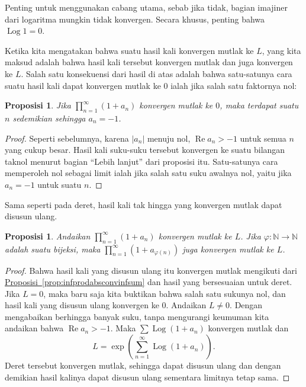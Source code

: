 \documentclass[12pt,openany]{book}
\renewcommand{\Re}{\operatorname{Re}}
\newcommand{\Log}{\operatorname{Log}}
\newcommand{\sabs}[1]{\lvert {#1} \rvert}
\newcommand{\N}{{\mathbb{N}}}
\newcommand{\myquote}[1]{``#1''}
\theoremstyle{plain}
\newtheorem{prop}[thm]{Proposisi}
\theoremstyle{remark}
\theoremstyle{definition}
\theoremstyle{exercise}
\theoremstyle{example}
\newcommand{\propref}[1]{\hyperref[#1]{Proposisi~\ref*{#1}}}
\begin{document}
Penting untuk menggunakan cabang utama, sebab jika tidak, bagian imajiner
dari logaritma mungkin tidak konvergen.  Secara khusus, penting
bahwa $\Log 1 = 0$.

Ketika kita mengatakan bahwa suatu hasil kali konvergen mutlak ke $L$, yang kita maksud adalah bahwa
hasil kali tersebut konvergen mutlak dan juga konvergen ke $L$.
Salah satu konsekuensi dari hasil di atas adalah bahwa satu-satunya cara
suatu hasil kali dapat konvergen mutlak ke $0$ ialah jika salah satu
faktornya nol:

\begin{prop}
Jika $\prod_{n=1}^\infty (1+a_n)$ konvergen mutlak ke $0$, maka terdapat
suatu $n$ sedemikian sehingga $a_n=-1$.
\end{prop}

\begin{proof}
Seperti sebelumnya, karena $\sabs{a_n}$ menuju nol,
$\Re a_n > -1$ untuk semua $n$ yang cukup besar.  Hasil kali
suku-suku tersebut konvergen ke suatu bilangan taknol menurut bagian \myquote{Lebih lanjut} dari
proposisi itu.  Satu-satunya cara memperoleh nol sebagai limit ialah jika salah satu suku
awalnya nol, yaitu jika $a_n=-1$ untuk suatu $n$.
\end{proof}

Sama seperti pada deret,
hasil kali tak hingga yang konvergen mutlak dapat disusun ulang.

\begin{prop}
Andaikan $\prod_{n=1}^\infty (1+a_n)$ konvergen mutlak ke $L$.
Jika $\varphi \colon \N \to \N$ adalah suatu bijeksi, maka 
$\prod_{n=1}^\infty (1+a_{\varphi(n)})$ juga konvergen mutlak ke $L$.
\end{prop}

\begin{proof}
Bahwa hasil kali yang disusun ulang itu konvergen mutlak mengikuti dari 
\propref{prop:infprodabsconvinfsum} dan hasil yang bersesuaian untuk deret.
Jika $L=0$, maka baru saja kita buktikan bahwa salah satu sukunya nol,
dan hasil kali yang disusun ulang konvergen ke $0$.
Andaikan $L \neq 0$.
Dengan mengabaikan berhingga banyak suku, tanpa mengurangi keumuman kita andaikan
bahwa $\Re a_n > -1$.  Maka $\sum \Log(1+a_n)$ konvergen mutlak dan
\begin{equation*}
L = \exp\left(\sum_{n=1}^\infty \Log(1+a_n)\right) .
\end{equation*}
Deret tersebut konvergen mutlak, sehingga dapat disusun ulang dan dengan demikian hasil kalinya
dapat disusun ulang sementara limitnya tetap sama.
\end{proof}
\end{document}
